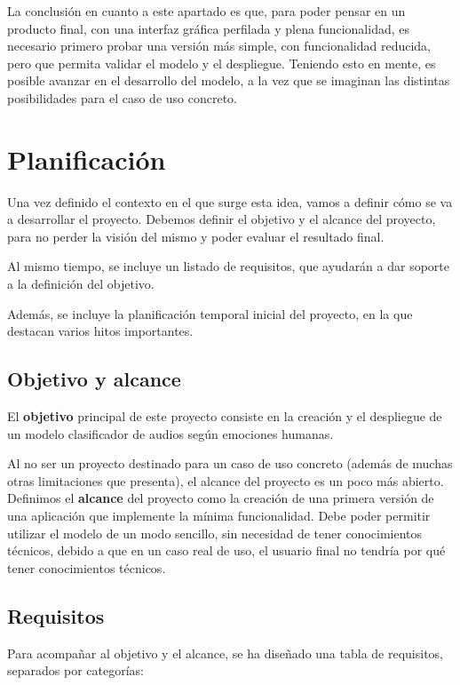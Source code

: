 La conclusión en cuanto a este apartado es que, para poder pensar en un producto final, con una interfaz gráfica perfilada y plena funcionalidad, es necesario primero probar una versión más simple, con funcionalidad reducida, pero que permita validar el modelo y el despliegue.
Teniendo esto en mente, es posible avanzar en el desarrollo del modelo, a la vez que se imaginan las distintas posibilidades para el caso de uso concreto.


\section{Planificación}\label{sec:planificacion}

Una vez definido el contexto en el que surge esta idea, vamos a definir cómo se va a desarrollar el proyecto.
Debemos definir el objetivo y el alcance del proyecto, para no perder la visión del mismo y poder evaluar el resultado final.

Al mismo tiempo, se incluye un listado de requisitos, que ayudarán a dar soporte a la definición del objetivo.

Además, se incluye la planificación temporal inicial del proyecto, en la que destacan varios hitos importantes.


\subsection{Objetivo y alcance}\label{sec:objetivo}
El \textbf{objetivo} principal de este proyecto consiste en la creación y el despliegue de un modelo clasificador de audios según emociones humanas.

Al no ser un proyecto destinado para un caso de uso concreto (además de muchas otras limitaciones que presenta), el alcance del proyecto es un poco más abierto.
Definimos el \textbf{alcance} del proyecto como la creación de una primera versión de una aplicación que implemente la mínima funcionalidad.
Debe poder permitir utilizar el modelo de un modo sencillo, sin necesidad de tener conocimientos técnicos, debido a que en un caso real de uso, el usuario final no tendría por qué tener conocimientos técnicos.


\subsection{Requisitos}\label{sec:requisitos}

Para acompañar al objetivo y el alcance, se ha diseñado una tabla de requisitos, separados por categorías:

